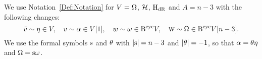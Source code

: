 \documentclass[\MainFolder/Text.tex]{subfiles}
\begin{document}
\begin{Notation} \label{Def:DeRham}
We use Notation~\ref{Def:Notation} for $V=\Omega{}$, $\mathcal{H}{}$, $\mathrm{H}_{\mathrm{dR}}{}$ and $A=n-3$ with the following changes:
$$\tilde{v}\sim \eta \in V,\quad v \sim \alpha\in V[1],\quad w\sim \omega \in \mathrm{B}^{\mathrm{cyc}} V, \quad \text{\footnotesize W}\sim \Omega\in \mathrm{B}^{\mathrm{cyc}} V[n-3]. $$
We use the formal symbols $\mathrm{s}$ and $\theta$ with $|\mathrm{s}| = n - 3$ and $|\theta| = -1$, so that $\alpha = \theta \eta$ and $\Omega = \mathrm{s} \omega$.
\end{Notation}
% 
%
\end{document}
